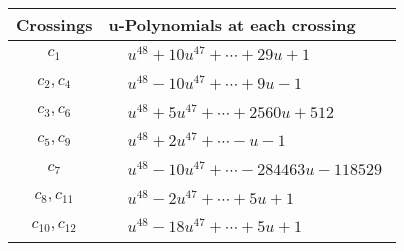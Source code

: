 \documentclass[1p]{elsarticle_modified}
\theoremstyle{definition}
\begin{document}
\begin{tabular}{m{50pt}|m{274pt}}
Crossings & \hspace{64pt}u-Polynomials at each crossing \\
\hline $$\begin{aligned}c_{1}\end{aligned}$$&$\begin{aligned}
&u^{48}+10 u^{47}+\cdots+29 u+1
\end{aligned}$\\
\hline $$\begin{aligned}c_{2},c_{4}\end{aligned}$$&$\begin{aligned}
&u^{48}-10 u^{47}+\cdots+9 u-1
\end{aligned}$\\
\hline $$\begin{aligned}c_{3},c_{6}\end{aligned}$$&$\begin{aligned}
&u^{48}+5 u^{47}+\cdots+2560 u+512
\end{aligned}$\\
\hline $$\begin{aligned}c_{5},c_{9}\end{aligned}$$&$\begin{aligned}
&u^{48}+2 u^{47}+\cdots- u-1
\end{aligned}$\\
\hline $$\begin{aligned}c_{7}\end{aligned}$$&$\begin{aligned}
&u^{48}-10 u^{47}+\cdots-284463 u-118529
\end{aligned}$\\
\hline $$\begin{aligned}c_{8},c_{11}\end{aligned}$$&$\begin{aligned}
&u^{48}-2 u^{47}+\cdots+5 u+1
\end{aligned}$\\
\hline $$\begin{aligned}c_{10},c_{12}\end{aligned}$$&$\begin{aligned}
&u^{48}-18 u^{47}+\cdots+5 u+1
\end{aligned}$\\
\hline
\end{tabular}\\~\\
\newpage\renewcommand{\arraystretch}{1}
\end{document}
